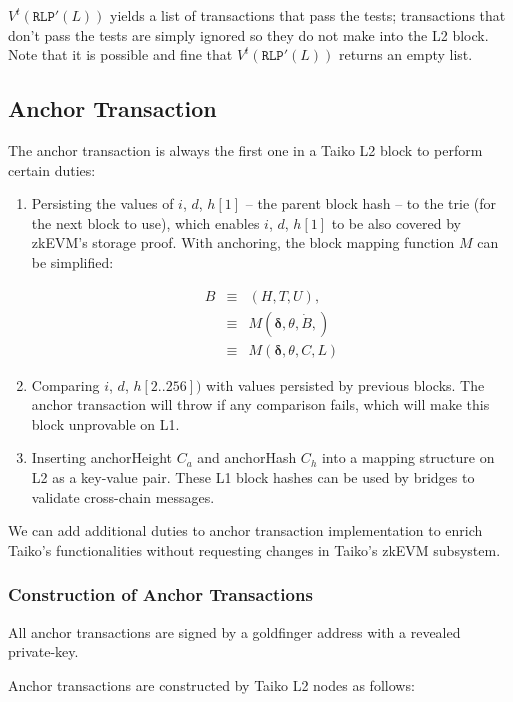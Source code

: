 \documentclass[9pt,oneside]{amsart}
\begin{document}
\begin{multicols}{2}
$V^t(\texttt{RLP}'(L))$ yields a list of transactions that pass the tests; transactions that don't pass the tests are simply ignored so they do not make into the L2 block. Note that it is possible and fine that $V^t(\texttt{RLP}'(L))$ returns an empty list.


\subsection{Anchor Transaction} \label{sec:anchoring}

The anchor transaction is always the first one in a Taiko L2 block to perform certain duties:

\begin{enumerate}
\item Persisting the values of $i$, $d$, $h[1]$ -- the parent block hash -- to the trie (for the next block to use), which enables $i$, $d$, $h[1]$ to be also covered by  zkEVM's storage proof.   With anchoring, the block mapping function $M$  can be simplified:

\begin{eqnarray}
B & \equiv & (H, T, U), \\
\nonumber & \equiv &  M(\boldsymbol{\delta}, \theta, \dot{B}, )  \\
\nonumber & \equiv & M(\boldsymbol{\delta},  \theta, C, L)
\end{eqnarray}

\item Comparing $i$, $d$, $h[2..256])$ with values persisted by previous blocks. The anchor transaction will throw if any comparison fails, which will make this block unprovable on L1.
\item Inserting anchorHeight $C_a$ and anchorHash $C_h$ into a mapping structure on L2 as a key-value pair. These L1 block hashes can be used by bridges to validate cross-chain messages.
\end{enumerate}

We can add additional duties to anchor transaction implementation to enrich Taiko's functionalities without requesting changes in Taiko's zkEVM subsystem.

\subsubsection{Construction of Anchor Transactions} All anchor transactions are signed by a goldfinger address with a revealed private-key. 

Anchor transactions are constructed by Taiko L2 nodes as follows:


\end{multicols}
\end{document}
